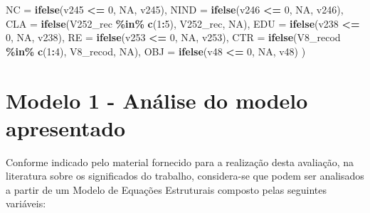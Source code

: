 \documentclass[
  12pt,
]{article}
\newenvironment{Shaded}{\begin{snugshade}}{\end{snugshade}}
\newcommand{\DataTypeTok}[1]{\textcolor[rgb]{0.13,0.29,0.53}{#1}}
\newcommand{\DecValTok}[1]{\textcolor[rgb]{0.00,0.00,0.81}{#1}}
\newcommand{\KeywordTok}[1]{\textcolor[rgb]{0.13,0.29,0.53}{\textbf{#1}}}
\newcommand{\NormalTok}[1]{#1}
\newcommand{\OperatorTok}[1]{\textcolor[rgb]{0.81,0.36,0.00}{\textbf{#1}}}
\newcommand{\OtherTok}[1]{\textcolor[rgb]{0.56,0.35,0.01}{#1}}
\newcommand{\StringTok}[1]{\textcolor[rgb]{0.31,0.60,0.02}{#1}}
\begin{document}
\begin{Shaded}
\begin{Highlighting}[]
            \DataTypeTok{NC =} \KeywordTok{ifelse}\NormalTok{(v245 }\OperatorTok{\textless{}=}\StringTok{ }\DecValTok{0}\NormalTok{, }\OtherTok{NA}\NormalTok{, v245),}
            \DataTypeTok{NIND =} \KeywordTok{ifelse}\NormalTok{(v246 }\OperatorTok{\textless{}=}\StringTok{ }\DecValTok{0}\NormalTok{, }\OtherTok{NA}\NormalTok{, v246),}
            \DataTypeTok{CLA =} \KeywordTok{ifelse}\NormalTok{(V252\_rec }\OperatorTok{\%in\%}\StringTok{ }\KeywordTok{c}\NormalTok{(}\DecValTok{1}\OperatorTok{:}\DecValTok{5}\NormalTok{), V252\_rec, }\OtherTok{NA}\NormalTok{),}
            \DataTypeTok{EDU =} \KeywordTok{ifelse}\NormalTok{(v238 }\OperatorTok{\textless{}=}\StringTok{ }\DecValTok{0}\NormalTok{, }\OtherTok{NA}\NormalTok{, v238),}
            \DataTypeTok{RE =} \KeywordTok{ifelse}\NormalTok{(v253 }\OperatorTok{\textless{}=}\StringTok{ }\DecValTok{0}\NormalTok{, }\OtherTok{NA}\NormalTok{, v253),}
            \DataTypeTok{CTR =} \KeywordTok{ifelse}\NormalTok{(V8\_recod }\OperatorTok{\%in\%}\StringTok{ }\KeywordTok{c}\NormalTok{(}\DecValTok{1}\OperatorTok{:}\DecValTok{4}\NormalTok{), V8\_recod, }\OtherTok{NA}\NormalTok{),}
            \DataTypeTok{OBJ =} \KeywordTok{ifelse}\NormalTok{(v48 }\OperatorTok{\textless{}=}\StringTok{ }\DecValTok{0}\NormalTok{, }\OtherTok{NA}\NormalTok{, v48)}
\NormalTok{            )}
\end{Highlighting}
\end{Shaded}

\normalsize

\hypertarget{modelo-1---anuxe1lise-do-modelo-apresentado}{%
\section{Modelo 1 - Análise do modelo
apresentado}\label{modelo-1---anuxe1lise-do-modelo-apresentado}}

Conforme indicado pelo material fornecido para a realização desta
avaliação, na literatura sobre os significados do trabalho, considera-se
que podem ser analisados a partir de um Modelo de Equações Estruturais
composto pelas seguintes variáveis:
\end{document}
